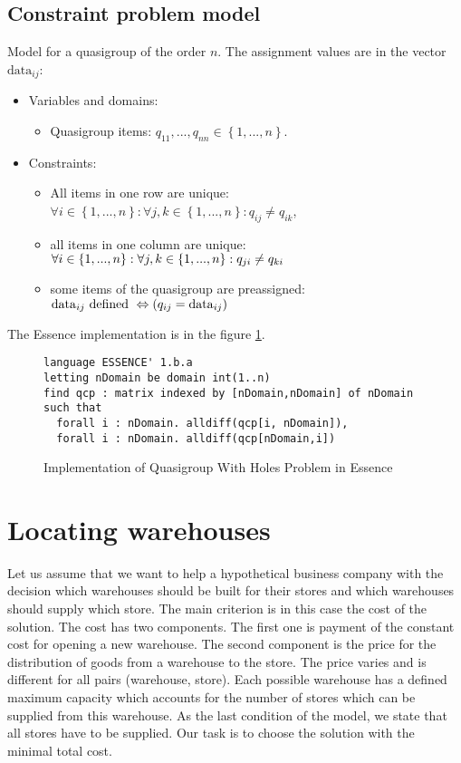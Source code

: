 \subsection{Constraint problem model}
Model for a quasigroup of the order $n$. The assignment values are in the vector $\mathrm{data}_{ij}$:

\begin{itemize}
	\item Variables and domains: 
    \begin{itemize}
      \item Quasigroup items: $q_{11}, ..., q_{nn} \in \left\{1, ..., n\right\}$.
    \end{itemize}
	\item Constraints:
	 \begin{itemize}
    	\item All items in one row are unique: $\forall i \in \left\{1, ..., n\right\}: \forall j,k \in \left\{1, ..., n\right\}: q_{ij} \neq q_{ik}$, 
    	\item all items in one column are unique: $\forall i \in \left\{1, ..., n\right\}:\\ \forall j,k \in \left\{1, ..., n\right\}: q_{ji} \neq q_{ki}$ 
    	\item some items of the quasigroup are preassigned: $\mathrm{data}_{ij} \textnormal{ defined } \Leftrightarrow (q_{ij} = \mathrm{data}_{ij})$
	 \end{itemize}
\end{itemize}
The Essence implementation is in the figure \ref{benchmark-essence:qwh}.

\begin{figure}
\caption{\label{benchmark-essence:qwh}Implementation of Quasigroup With Holes Problem in Essence}
\begin{lstlisting}
language ESSENCE' 1.b.a
letting nDomain be domain int(1..n)
find qcp : matrix indexed by [nDomain,nDomain] of nDomain
such that
  forall i : nDomain. alldiff(qcp[i, nDomain]),
  forall i : nDomain. alldiff(qcp[nDomain,i])
\end{lstlisting} 
\end{figure}

\section{Locating warehouses}
Let us assume that we want to help a hypothetical business company with the decision which
warehouses should be built for their stores and which warehouses should supply which
store. The main criterion is in this case the cost of the solution. The cost has two components. The first one
is payment of the constant cost for opening a new warehouse. The second component is the price for the distribution of
goods from a warehouse to the store. The price varies and is different for all pairs (warehouse, store). 
Each possible warehouse has a defined maximum capacity which accounts for the number
of stores which can be supplied from this warehouse. As the last condition of the model, 
we state that all stores have to be supplied. Our task is to choose the solution with 
the minimal total cost.

